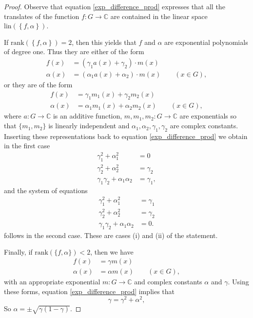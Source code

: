 \documentclass[a4paper,12pt]{article}
\theoremstyle{plain}
\theoremstyle{definition}
\theoremstyle{remark}
\begin{document}
\begin{proof}
 Observe that equation \eqref{exp_difference_prod} expresses that all the translates of the function 
 $f\colon G\to \mathbb{C}$ are contained in the linear space $\mathrm{lin}(\left\{ f, \alpha\right\})$. 
 
 If $\mathrm{rank}(\left\{ f, \alpha\right\})=2$, then this yields that $f$ and $\alpha$ are exponential polynomials of degree one. Thus they are either of the form 
 \begin{align*}
  f(x)&= (\gamma_{1}a(x)+\gamma_{2})\cdot m(x)\\
  \alpha(x)&= (\alpha_{1}a(x)+\alpha_{2})\cdot m(x)
  \qquad 
  \left(x\in G\right), 
 \end{align*}
 or they are of the form 
 \begin{align*}
  f(x)&= \gamma_{1}m_{1}(x)+\gamma_{2}m_{2}(x)\\
  \alpha(x)&= \alpha_{1}m_{1}(x)+\alpha_{2}m_{2}(x)
  \qquad 
  \left(x\in G\right), 
 \end{align*}
where $a\colon G\to \mathbb{C}$ is an additive function, $m, m_{1}, m_{2}\colon G\to \mathbb{C}$ are exponentials so that $\{ m_{1}, m_{2}\}$ is linearly independent and $\alpha_{1}, \alpha_{2}, \gamma_{1}, \gamma_{2}$ are complex constants. Inserting these representations back to equation \eqref{exp_difference_prod} we obtain in the first case 
\begin{align*}
 \gamma_{1}^{2}+\alpha_{1}^2&=0\\
 \gamma_{2}^{2}+\alpha_{2}^2&=\gamma_{2}\\
 \gamma_{1}\gamma_{2}+\alpha_{1}\alpha_{2}&= \gamma_{1}, 
\end{align*} 
and the system of equations 
\begin{align*}
 \gamma_{1}^{2}+\alpha_{1}^2&=\gamma_{1}\\
 \gamma_{2}^{2}+\alpha_{2}^2&=\gamma_{2}\\
 \gamma_{1}\gamma_{2}+\alpha_{1}\alpha_{2}&= 0. 
 \end{align*}
 follows in the second case. These are  cases (i) and (ii) of the statement. 
 
 Finally, if $\mathrm{rank}(\{ f, \alpha \})<2$, then we have 
 \begin{align*}
  f(x)&= \gamma m(x)\\
  \alpha(x)&= \alpha m(x) 
  \qquad 
  \left(x\in G\right), 
 \end{align*}
with an appropriate exponential $m\colon G\to \mathbb{C}$ and complex constants $\alpha$ and $\gamma$. Using these forms, equation \eqref{exp_difference_prod} implies that 
\[
 \gamma = \gamma^2+\alpha^2, 
\]
So $\alpha= \pm\sqrt{\gamma(1-\gamma)}$. 
\end{proof}
\end{document}
